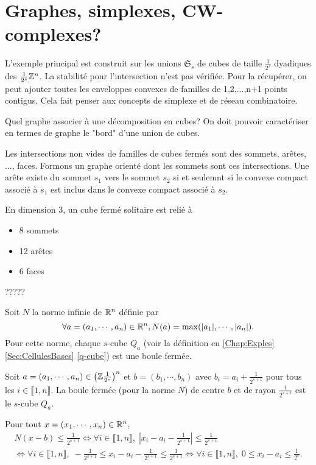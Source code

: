 \section{Graphes, simplexes, CW-complexes?}
L'exemple principal est construit sur les unions $\mathfrak{S}_s$ de cubes de taille $\frac{1}{2^s}$ dyadiques des $\frac{1}{2^s}\mathbb{Z}^n$. La stabilité pour l'intersection n'est pas vérifiée. Pour la récupérer, on peut ajouter toutes les enveloppes convexes de familles de 1,2,...,n+1 points contigus. Cela fait penser aux concepts de simplexe et de réseau combinatoire.

Quel graphe associer à une décomposition en cubes?
On doit pouvoir caractériser en termes de graphe le "bord" d'une union de cubes.

Les intersections non vides de familles de cubes fermés sont des sommets, arêtes, ..., faces. Formons un graphe orienté dont les sommets sont ces intersections. Une arête existe du sommet $s_1$ vers le sommet $s_2$ si et seulemnt si le convexe compact associé à $s_1$ est inclus dans le convexe compact associé à $s_2$.

En dimension 3, un cube fermé solitaire est relié à
\begin{itemize}
 \item 8 sommets
 \item 12 arêtes
 \item 6 faces
\end{itemize}
?????

Soit $N$ la norme infinie de $\mathbb{R}^n$ définie par
\begin{displaymath}
 \forall a =(a_1, \cdots, a_n) \in \mathbb{R}^n, N(a) = \max(|a_1|, \cdots ,|a_n|).
\end{displaymath}
Pour cette norme, chaque $s$-cube $Q_a$ (voir la définition en \ref{Chap:Exples}\ref{Sec:CellulesBases} \ref{q-cube}) est une boule fermée.
\begin{propn}
Soit $a =(a_1, \cdots, a_n) \in \left(\mathbb{Z}\frac{1}{2^s}\right)^n$ et $b=(b_1,\cdots,b_n)$ avec $b_i = a_i + \frac{1}{2^{s+1}}$ pour tous les $i\in \llbracket 1,n\rrbracket$.\newline
La boule fermée (pour la norme $N$) de centre $b$ et de rayon $\frac{1}{2^{s+1}}$ est le $s$-cube $Q_a$.
\end{propn}
\begin{demo}
 Pour tout $x =(x_1, \cdots, x_n) \in \mathbb{R}^n$,
\begin{multline*}
 N(x-b)\leq \frac{1}{2^{s+1}}
 \Leftrightarrow
 \forall i \in \llbracket 1, n\rrbracket, \; \left|x_i - a_i - \frac{1}{2^{s+1}} \right| \leq \frac{1}{2^{s+1}} \\
 \Leftrightarrow
 \forall i \in \llbracket 1, n\rrbracket, \; -\frac{1}{2^{s+1}} \leq x_i - a_i - \frac{1}{2^{s+1}} \leq \frac{1}{2^{s+1}}
 \Leftrightarrow
 \forall i \in \llbracket 1, n\rrbracket, \; 0 \leq x_i - a_i \leq \frac{1}{2^{s}}.
\end{multline*}
\end{demo}



